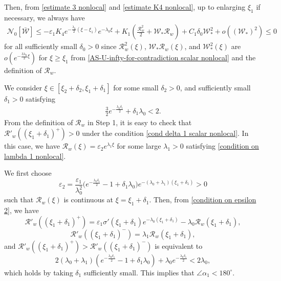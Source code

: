 \documentclass[11pt,a4paper]{article}
\numberwithin{equation}{section}
\numberwithin{figure}{section}
\newcommand\bea{\begin{eqnarray}}
\newcommand\eea{\end{eqnarray}}
\newcommand\beaa{\begin{eqnarray*}}
\newcommand\eeaa{\end{eqnarray*}}
\begin{document}
Then, from \eqref{estimate 3 nonlocal} and \eqref{estimate K4 nonlocal}, up to enlarging $\xi_1$ if necessary, we always have %
\beaa
\mathcal{N}_0[\bar{\mathcal{W}}]\le -\varepsilon_1K_4e^{-\frac{\lambda_0}{2}(\xi-\xi_1)}e^{-\lambda_0\xi}+K_1(\frac{\mathcal{R}_w^2}{2}+\mathcal{W}_*\mathcal{R}_w)+C_1\delta_0\mathcal{W}_*^2+o((\mathcal{W}_*)^2)\le 0
\eeaa
for all sufficiently small $\delta_0>0$
since $\mathcal{R}_w^2(\xi)$, $\mathcal{W}_*\mathcal{R}_w(\xi)$, and  $\mathcal{W}_*^2(\xi)$ are $o(e^{-\frac{3\lambda_0}{2}\xi})$ for $\xi\ge \xi_1$ from \eqref{AS-U-infty-for-contradiction scalar nonlocal} and the definition of $\mathcal{R}_w$.


\medskip


 We consider $\xi\in[\xi_2+\delta_2,\xi_1+\delta_1]$ for some small $\delta_2>0$, and sufficiently small $\delta_1>0$ satisfying
\bea\label{cond delta 1 scalar nonlocal}
\frac{3}{2}e^{-\frac{\lambda_0\delta_1}{2}}+\delta_1\lambda_0<2.
\eea
From the definition of $\mathcal{R}_w$ in Step 1, it is easy to check that $\mathcal{R}'_w((\xi_1+\delta_1)^+)>0$ under the condition \eqref{cond delta 1 scalar nonlocal}.
In this case, we have $\mathcal{R}_w(\xi)=\varepsilon_2 e^{\lambda_1\xi}$
for some large $\lambda_1>0$ satisfying \eqref{condition on lambda 1 nonlocal}.

We first choose
\begin{equation}\label{condition on epsilon 2}
\varepsilon_2=\frac{\varepsilon_1}{\lambda^2_0}\Big(e^{-\frac{\lambda_0\delta_1}{2}}-1+\delta_1\lambda_0\Big)e^{-(\lambda_0+\lambda_1)(\xi_1+\delta_1)}>0
\end{equation}
such that $\mathcal{R}_w(\xi)$ is continuous at $\xi=\xi_{1}+\delta_1$. Then, from \eqref{condition on epsilon 2}, we have
$$\mathcal{R}'_w((\xi_1+\delta_1)^{+})=\varepsilon_1\sigma'(\xi_1+\delta_1)e^{-\lambda_0(\xi_1+\delta_1)}- \lambda_0\mathcal{R}_w(\xi_1+\delta_1),$$
$$\mathcal{R}'_w((\xi_1+\delta_1)^{-})=\lambda_1\mathcal{R}_w(\xi_1+\delta_1),$$
and $\mathcal{R}'_w((\xi_1+\delta_1)^{+})>\mathcal{R}'_w((\xi_1+\delta_1)^{-})$ is equivalent to
$$2(\lambda_0+\lambda_1)(e^{-\frac{\lambda_0\delta_1}{2}}-1+\delta_1\lambda_0)+\lambda_0e^{-\frac{\lambda_0\delta_1}{2}}<2\lambda_0,$$
which holds by taking $\delta_1$ sufficiently small.
This implies that $\angle\alpha_1<180^{\circ}$.
\end{document}
